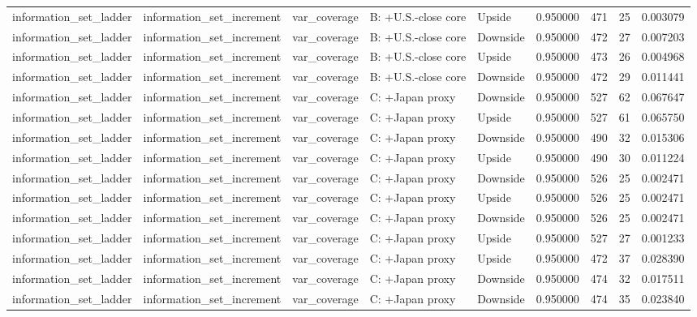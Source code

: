 \begin{tabular}{lllllrrr}
information\_set\_ladder & information\_set\_increment & var\_coverage & B: +U.S.-close core & Upside & 0.950000 & 471 & 25 & 0.003079 \\
information\_set\_ladder & information\_set\_increment & var\_coverage & B: +U.S.-close core & Downside & 0.950000 & 472 & 27 & 0.007203 \\
information\_set\_ladder & information\_set\_increment & var\_coverage & B: +U.S.-close core & Upside & 0.950000 & 473 & 26 & 0.004968 \\
information\_set\_ladder & information\_set\_increment & var\_coverage & B: +U.S.-close core & Downside & 0.950000 & 472 & 29 & 0.011441 \\
information\_set\_ladder & information\_set\_increment & var\_coverage & C: +Japan proxy & Downside & 0.950000 & 527 & 62 & 0.067647 \\
information\_set\_ladder & information\_set\_increment & var\_coverage & C: +Japan proxy & Upside & 0.950000 & 527 & 61 & 0.065750 \\
information\_set\_ladder & information\_set\_increment & var\_coverage & C: +Japan proxy & Downside & 0.950000 & 490 & 32 & 0.015306 \\
information\_set\_ladder & information\_set\_increment & var\_coverage & C: +Japan proxy & Upside & 0.950000 & 490 & 30 & 0.011224 \\
information\_set\_ladder & information\_set\_increment & var\_coverage & C: +Japan proxy & Downside & 0.950000 & 526 & 25 & 0.002471 \\
information\_set\_ladder & information\_set\_increment & var\_coverage & C: +Japan proxy & Upside & 0.950000 & 526 & 25 & 0.002471 \\
information\_set\_ladder & information\_set\_increment & var\_coverage & C: +Japan proxy & Downside & 0.950000 & 526 & 25 & 0.002471 \\
information\_set\_ladder & information\_set\_increment & var\_coverage & C: +Japan proxy & Upside & 0.950000 & 527 & 27 & 0.001233 \\
information\_set\_ladder & information\_set\_increment & var\_coverage & C: +Japan proxy & Upside & 0.950000 & 472 & 37 & 0.028390 \\
information\_set\_ladder & information\_set\_increment & var\_coverage & C: +Japan proxy & Downside & 0.950000 & 474 & 32 & 0.017511 \\
information\_set\_ladder & information\_set\_increment & var\_coverage & C: +Japan proxy & Downside & 0.950000 & 474 & 35 & 0.023840 \\

\end{tabular}
